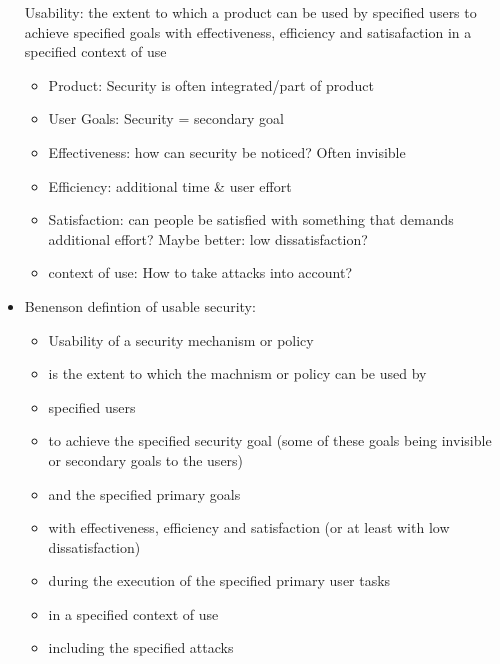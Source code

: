 \documentclass[a4paper,12pt]{scrartcl}
\begin{document}
\begin{itemize}
		Usability: the extent to which a product can be used by specified users to achieve specified goals with effectiveness, efficiency and satisafaction in a specified context of use
		\begin{itemize}
			\item
				Product: Security is often integrated/part of product
			\item
				User Goals: Security = secondary goal
			\item
				Effectiveness: how can security be noticed? Often invisible
			\item
				Efficiency: additional time \& user effort
			\item
				Satisfaction: can people be satisfied with something that demands additional effort? Maybe better: low dissatisfaction?
			\item
				context of use: How to take attacks into account?
		\end{itemize}
	\item
		Benenson defintion of usable security:
		\begin{itemize}
			\item
				Usability of a security mechanism or policy
			\item
				is the extent to which the machnism or policy can be used by
			\item
				specified users
			\item
				to achieve the specified security goal (some of these goals being invisible or secondary goals to the users)
			\item
				and the specified primary goals
			\item
				with effectiveness, efficiency and satisfaction (or at least with low dissatisfaction)
			\item
				during the execution of the specified primary user tasks
			\item
				in a specified context of use
			\item
				including the specified attacks
		\end{itemize}
\end{itemize}
\end{document}
